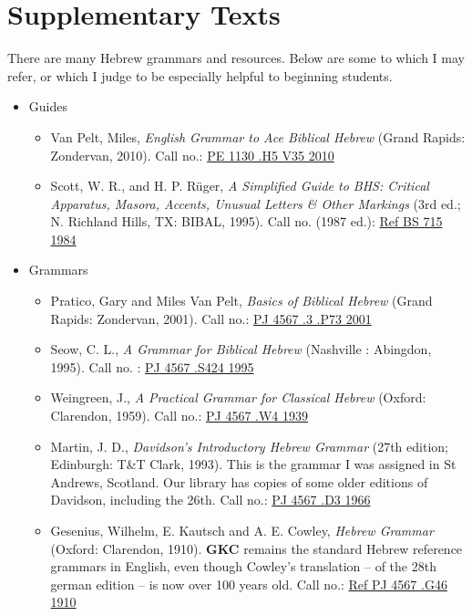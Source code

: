 \documentclass[titlepage]{article}
\begin{document}
\section{Supplementary Texts}
\label{supplementary}

There are many Hebrew grammars and resources. Below are some to which
I may refer, or which I judge to be especially helpful to beginning
students.

\begin{itemize}
  \item Guides

    \begin{itemize}
      \item
        Van Pelt, Miles, \emph{English Grammar to Ace Biblical Hebrew}
        (Grand Rapids: Zondervan, 2010). Call no.:
        \href{http://cat.tyndale.ca/vwebv/holdingsInfo?bibId=146389}{PE 1130 .H5 V35 2010}
      \item
        Scott, W. R., and H. P. Rüger, \emph{A Simplified Guide to BHS:
        Critical Apparatus, Masora, Accents, Unusual Letters \& Other
        Markings} (3rd ed.; N. Richland Hills, TX: BIBAL, 1995). Call
        no. (1987 ed.):
        \href{http://cat.tyndale.ca/vwebv/holdingsInfo?bibId=73217}{Ref BS 715 1984}
    \end{itemize}

  \item Grammars

    \begin{itemize}
      \item
        Pratico, Gary and Miles Van Pelt, \emph{Basics of Biblical Hebrew}
        (Grand Rapids: Zondervan, 2001). Call no.:
        \href{http://cat.tyndale.ca/vwebv/holdingsInfo?bibId=58735}{PJ 4567 .3 .P73 2001}
      \item
        Seow, C. L., \emph{A Grammar for Biblical Hebrew} (Nashville   :
        Abingdon, 1995). Call no.                                      :
        \href{http://cat.tyndale.ca/vwebv/holdingsInfo?bibId=23111}{PJ 4567 .S424 1995}
      \item
        Weingreen, J., \emph{A Practical Grammar for Classical Hebrew}
        (Oxford: Clarendon, 1959). Call no.:
        \href{http://cat.tyndale.ca/vwebv/holdingsInfo?bibId=13817}{PJ 4567 .W4 1939}
      \item
        Martin, J. D., \emph{Davidson’s Introductory Hebrew Grammar}
        (27th edition; Edinburgh: T\&T Clark, 1993). This is the grammar
        I was assigned in St Andrews, Scotland. Our library has copies
        of some older editions of Davidson, including the 26th. Call no.:
        \href{http://cat.tyndale.ca/vwebv/holdingsInfo?bibId=13804}{PJ 4567 .D3 1966}
      \item
        Gesenius, Wilhelm, E. Kautsch and A. E. Cowley, \emph{Hebrew
        Grammar} (Oxford: Clarendon, 1910). \textbf{GKC} remains the
        standard Hebrew reference grammars in English, even though
        Cowley's translation -- of the 28th german edition -- is now
        over 100 years old. Call no.:
        \href{http://cat.tyndale.ca/vwebv/holdingsInfo?bibId=72811}{Ref PJ 4567 .G46 1910}
    \end{itemize}


\end{itemize}
\end{document}
